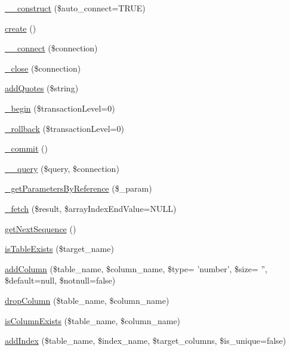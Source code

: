 \begin{DoxyCompactItemize}
\item 
\hyperlink{classDBMssql_a96b133e5d7f3c45f400d2bc987a354f5}{\-\_\-\-\_\-construct} (\$auto\-\_\-connect=T\-R\-U\-E)
\item 
\hyperlink{classDBMssql_a1be3ce3432e43e0a5080ada450971345}{create} ()
\item 
\hyperlink{classDBMssql_a369f968ee79e1eb30e5d640c2294a7d1}{\-\_\-\-\_\-connect} (\$connection)
\item 
\hyperlink{classDBMssql_a64f2fc08d576cdcfc0dd3a80343a0e5a}{\-\_\-close} (\$connection)
\item 
\hyperlink{classDBMssql_ac380f1918abd17fd5cba28accfaec9fc}{add\-Quotes} (\$string)
\item 
\hyperlink{classDBMssql_ae44697dbc8dd678df78458a407e40c03}{\-\_\-begin} (\$transaction\-Level=0)
\item 
\hyperlink{classDBMssql_a35fd47dce4ad5dabbc3b994f5774afb7}{\-\_\-rollback} (\$transaction\-Level=0)
\item 
\hyperlink{classDBMssql_a08f359cc1c5ce91fde7139446252e8c4}{\-\_\-commit} ()
\item 
\hyperlink{classDBMssql_aa2d0d2f6680d70399f493b567d94ed92}{\-\_\-\-\_\-query} (\$query, \$connection)
\item 
\hyperlink{classDBMssql_a09c8011c16ac2e01c6fca9d6f0e6b7f6}{\-\_\-get\-Parameters\-By\-Reference} (\$\-\_\-param)
\item 
\hyperlink{classDBMssql_aed12cc502a2d8ee9ce8821af12d45b9e}{\-\_\-fetch} (\$result, \$array\-Index\-End\-Value=N\-U\-L\-L)
\item 
\hyperlink{classDBMssql_ad4342b7988253c6bbeec102b2c454659}{get\-Next\-Sequence} ()
\item 
\hyperlink{classDBMssql_add743e9c5148edf4f393209b1f4b9cd6}{is\-Table\-Exists} (\$target\-\_\-name)
\item 
\hyperlink{classDBMssql_a6f2fbcd5fea5ac36821d96cfe8f106cd}{add\-Column} (\$table\-\_\-name, \$column\-\_\-name, \$type= 'number', \$size= '', \$default=null, \$notnull=false)
\item 
\hyperlink{classDBMssql_a802707618ed283cd4143c82972b3ade5}{drop\-Column} (\$table\-\_\-name, \$column\-\_\-name)
\item 
\hyperlink{classDBMssql_a5a96979e7fed50503b902d2983fa507a}{is\-Column\-Exists} (\$table\-\_\-name, \$column\-\_\-name)
\item 
\hyperlink{classDBMssql_a6202a3b8e96252f91ef104a854cf556c}{add\-Index} (\$table\-\_\-name, \$index\-\_\-name, \$target\-\_\-columns, \$is\-\_\-unique=false)

\end{DoxyCompactItemize}
